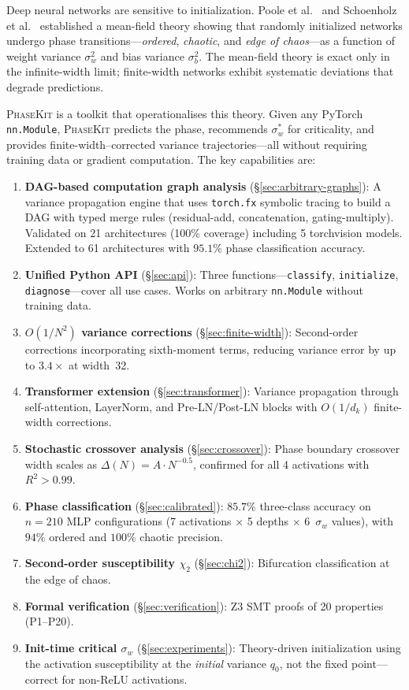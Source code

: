 \documentclass[10pt]{article}
\newcommand{\ToolName}{\textsc{PhaseKit}}
\begin{document}
Deep neural networks are sensitive to initialization.
Poole et al.~\cite{poole2016exponential} and Schoenholz et al.~\cite{schoenholz2017deep} established a mean-field theory showing that randomly initialized networks undergo phase transitions---\emph{ordered}, \emph{chaotic}, and \emph{edge of chaos}---as a function of weight variance $\sigma_w^2$ and bias variance $\sigma_b^2$.
The mean-field theory is exact only in the infinite-width limit; finite-width networks exhibit systematic deviations that degrade predictions.

\ToolName{} is a toolkit that operationalises this theory.
Given any PyTorch \texttt{nn.Module}, \ToolName{} predicts the phase, recommends $\sigma_w^*$ for criticality, and provides finite-width--corrected variance trajectories---all without requiring training data or gradient computation.
The key capabilities are:

\begin{enumerate}[nosep]
    \item \textbf{DAG-based computation graph analysis} (\S\ref{sec:arbitrary-graphs}): A variance propagation engine that uses \texttt{torch.fx} symbolic tracing to build a DAG with typed merge rules (residual-add, concatenation, gating-multiply). Validated on 21 architectures (100\% coverage) including 5 torchvision models. Extended to 61 architectures with $95.1\%$ phase classification accuracy.
    \item \textbf{Unified Python API} (\S\ref{sec:api}): Three functions---\texttt{classify}, \texttt{initialize}, \texttt{diagnose}---cover all use cases. Works on arbitrary \texttt{nn.Module} without training data.
    \item \textbf{$O(1/N^2)$ variance corrections} (\S\ref{sec:finite-width}): Second-order corrections incorporating sixth-moment terms, reducing variance error by up to $3.4\times$ at width~32.
    \item \textbf{Transformer extension} (\S\ref{sec:transformer}): Variance propagation through self-attention, LayerNorm, and Pre-LN/Post-LN blocks with $O(1/d_k)$ finite-width corrections.
    \item \textbf{Stochastic crossover analysis} (\S\ref{sec:crossover}): Phase boundary crossover width scales as $\Delta(N) = A \cdot N^{-0.5}$, confirmed for all 4 activations with $R^2 > 0.99$.
    \item \textbf{Phase classification} (\S\ref{sec:calibrated}): $85.7\%$ three-class accuracy on $n=210$ MLP configurations (7 activations $\times$ 5 depths $\times$ 6~$\sigma_w$ values), with $94\%$ ordered and $100\%$ chaotic precision.
    \item \textbf{Second-order susceptibility $\chi_2$} (\S\ref{sec:chi2}): Bifurcation classification at the edge of chaos.
    \item \textbf{Formal verification} (\S\ref{sec:verification}): Z3 SMT proofs of 20 properties (P1--P20).
    \item \textbf{Init-time critical $\sigma_w$} (\S\ref{sec:experiments}): Theory-driven initialization using the activation susceptibility at the \emph{initial} variance $q_0$, not the fixed point---correct for non-ReLU activations.
\end{enumerate}
\end{document}
